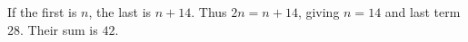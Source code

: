 If the first is $ n $, the last is $ n+14 $. Thus $ 2n=n+14 $, giving $ n=14 $ and last term $ 28 $. Their sum is $\boxed{42}$.
